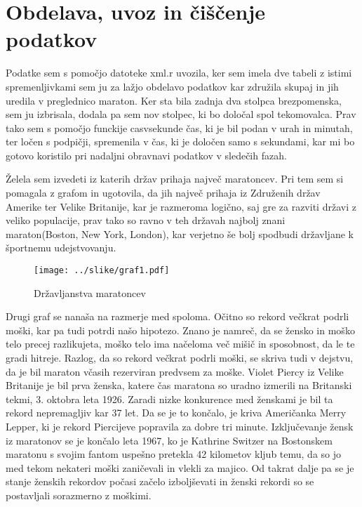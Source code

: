 \documentclass[11pt,a4paper]{article}
\begin{document}
\pagebreak
\section{Obdelava, uvoz in čiščenje podatkov}

Podatke sem s pomočjo datoteke xml.r uvozila, ker sem imela dve tabeli z istimi spremenljivkami sem ju za lažjo obdelavo podatkov kar združila skupaj in jih uredila v preglednico maraton. Ker sta bila zadnja dva stolpca brezpomenska, sem ju izbrisala, dodala pa sem nov stolpec, ki bo določal spol tekomovalca. Prav tako sem s pomočjo funckije casvsekunde čas, ki je bil podan v urah in minutah, ter ločen s podpičji, spremenila v čas, ki je določen samo s sekundami, kar mi bo gotovo koristilo pri nadaljni obravnavi podatkov v sledečih fazah.


Želela sem izvedeti iz katerih držav prihaja največ maratoncev. Pri tem sem si pomagala z grafom in ugotovila, da jih največ prihaja iz Združenih držav Amerike ter Velike Britanije, kar je razmeroma logično, saj gre za razviti državi z veliko populacije, prav tako so ravno v teh državah najbolj znani maraton(Boston, New York, London), kar verjetno še bolj spodbudi državljane k športnemu udejstvovanju.

\begin{figure}[H]
  \texttt{[image: ../slike/graf1.pdf]}
  \caption{Državljanstva maratoncev}
  \label{fig:Slika 1}
\end{figure}

\newpage
Drugi graf se nanaša na razmerje med spoloma. Očitno so rekord večkrat podrli moški, kar pa tudi potrdi našo hipotezo. Znano je namreč, da se žensko in moško telo precej razlikujeta, moško telo ima načeloma več mišič in sposobnost, da le te gradi hitreje.
Razlog, da so rekord večkrat podrli moški, se skriva tudi v dejstvu, da je bil maraton včasih rezerviran predvsem za moške. Violet Piercy iz Velike Britanije je bil prva ženska, katere čas maratona so uradno izmerili na Britanski tekmi, 3. oktobra leta 1926. Zaradi nizke konkurence med ženskami je bil ta rekord nepremagljiv kar 37 let. Da se je to končalo, je kriva Američanka Merry Lepper, ki je rekord Piercijeve popravila za dobre tri minute.
Izključevanje žensk iz maratonov se je končalo leta 1967, ko je Kathrine Switzer na Bostonskem maratonu s svojim fantom uspešno pretekla 42 kilometov kljub temu, da so jo med tekom nekateri moški zaničevali in vlekli za majico. Od takrat dalje pa se je stanje ženskih rekordov počasi začelo izboljševati in ženski rekordi so se postavljali sorazmerno z moškimi.
\end{document}
